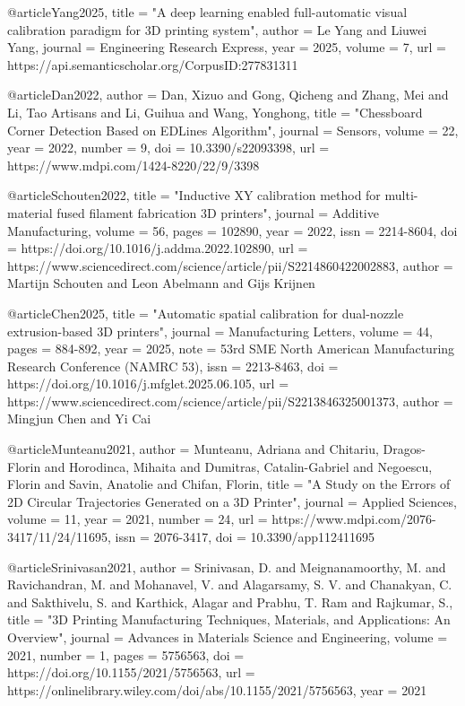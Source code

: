 @article{Yang2025,
	title     = "{A deep learning enabled full-automatic visual calibration paradigm for 3D printing system}",
	author    = {Le Yang and Liuwei Yang},
	journal   = {Engineering Research Express},
	year      = {2025},
	volume    = {7},
	url       = {https://api.semanticscholar.org/CorpusID:277831311}
}

@article{Dan2022,
	author    = {Dan, Xizuo and Gong, Qicheng and Zhang, Mei and Li, Tao Artisans and Li, Guihua and Wang, Yonghong},
	title     = "{Chessboard Corner Detection Based on EDLines Algorithm}",
	journal   = {Sensors},
	volume    = {22},
	year      = {2022},
	number    = {9},
	doi       = {10.3390/s22093398},
	url       = {https://www.mdpi.com/1424-8220/22/9/3398}
}

@article{Schouten2022,
	title     = "{Inductive XY calibration method for multi-material fused filament fabrication 3D printers}",
	journal   = {Additive Manufacturing},
	volume    = {56},
	pages     = {102890},
	year      = {2022},
	issn      = {2214-8604},
	doi       = {https://doi.org/10.1016/j.addma.2022.102890},
	url       = {https://www.sciencedirect.com/science/article/pii/S2214860422002883},
	author    = {Martijn Schouten and Leon Abelmann and Gijs Krijnen}
}

@article{Chen2025,
	title     = "{Automatic spatial calibration for dual-nozzle extrusion-based 3D printers}",
	journal   = {Manufacturing Letters},
	volume    = {44},
	pages     = {884-892},
	year      = {2025},
	note      = {53rd SME North American Manufacturing Research Conference (NAMRC 53)},
	issn      = {2213-8463},
	doi       = {https://doi.org/10.1016/j.mfglet.2025.06.105},
	url       = {https://www.sciencedirect.com/science/article/pii/S2213846325001373},
	author    = {Mingjun Chen and Yi Cai}
}

@article{Munteanu2021,
	author    = {Munteanu, Adriana and Chitariu, Dragos-Florin and Horodinca, Mihaita and Dumitras, Catalin-Gabriel and Negoescu, Florin and Savin, Anatolie and Chifan, Florin},
	title     = "{A Study on the Errors of 2D Circular Trajectories Generated on a 3D Printer}",
	journal   = {Applied Sciences},
	volume    = {11},
	year      = {2021},
	number    = {24},
	url       = {https://www.mdpi.com/2076-3417/11/24/11695},
	issn      = {2076-3417},
	doi       = {10.3390/app112411695}
}

@article{Srinivasan2021,
	author    = {Srinivasan, D. and Meignanamoorthy, M. and Ravichandran, M. and Mohanavel, V. and Alagarsamy, S. V. and Chanakyan, C. and Sakthivelu, S. and Karthick, Alagar and Prabhu, T. Ram and Rajkumar, S.},
	title     = "{3D Printing Manufacturing Techniques, Materials, and Applications: An Overview}",
	journal   = {Advances in Materials Science and Engineering},
	volume    = {2021},
	number    = {1},
	pages     = {5756563},
	doi       = {https://doi.org/10.1155/2021/5756563},
	url       = {https://onlinelibrary.wiley.com/doi/abs/10.1155/2021/5756563},
	year      = {2021}
}

